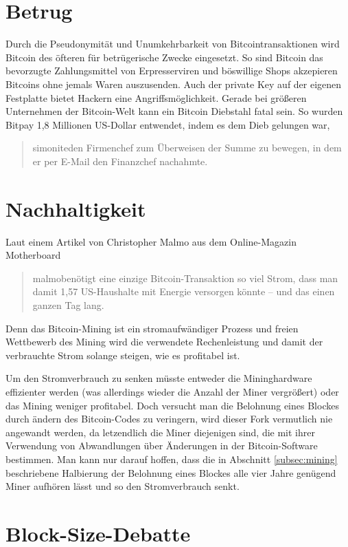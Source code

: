 \section{Betrug}

Durch die Pseudonymität und Unumkehrbarkeit von Bitcointransaktionen wird Bitcoin des öfteren für betrügerische Zwecke eingesetzt.
So sind Bitcoin das bevorzugte Zahlungsmittel von Erpresserviren und böswillige Shops akzepieren Bitcoins ohne jemals Waren auszusenden.
Auch der private Key auf der eigenen Festplatte bietet Hackern eine Angriffsmöglichkeit.
Gerade bei größeren Unternehmen der Bitcoin-Welt kann ein Bitcoin Diebstahl fatal sein.
So wurden Bitpay 1,8 Millionen US-Dollar entwendet, indem es dem Dieb gelungen war, \begin{quote}{simonite}den Firmenchef zum Überweisen der Summe zu bewegen, in dem er per E-Mail den Finanzchef nachahmte.\end{quote}

\section{Nachhaltigkeit}

Laut einem Artikel von Christopher Malmo aus dem Online-Magazin Motherboard \begin{quote}{malmo}benötigt eine einzige Bitcoin-Transaktion so viel Strom, dass man damit 1,57 US-Haushalte mit Energie versorgen könnte -- und das einen ganzen Tag lang.\end{quote}
Denn das Bitcoin-Mining ist ein stromaufwändiger Prozess und freien Wettbewerb des Mining wird die verwendete Rechenleistung und damit der verbrauchte Strom solange steigen, wie es profitabel ist.

Um den Stromverbrauch zu senken müsste entweder die Mininghardware effizienter werden (was allerdings wieder die Anzahl der Miner vergrößert) oder das Mining weniger profitabel.
Doch versucht man die Belohnung eines Blockes durch ändern des Bitcoin-Codes zu veringern, wird dieser Fork vermutlich nie angewandt werden, da letzendlich die Miner diejenigen sind, die mit ihrer Verwendung von Abwandlungen über Änderungen in der Bitcoin-Software bestimmen.
Man kann nur darauf hoffen, dass die in Abschnitt \ref{subsec:mining} beschriebene Halbierung der Belohnung eines Blockes alle vier Jahre genügend Miner aufhören lässt und so den Stromverbrauch senkt.

\section{Block-Size-Debatte}

